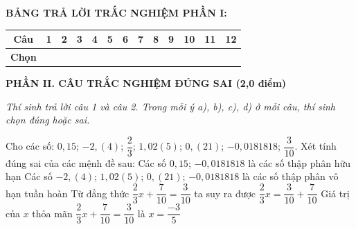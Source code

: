 \documentclass[12pt,a4paper]{article}
\begin{document}
\vspace{1mm}
\noindent\textbf{BẢNG TRẢ LỜI TRẮC NGHIỆM PHẦN I:}
\begin{center}
\begin{tabular}{|c|c|c|c|c|c|c|c|c|c|c|c|c|}
\hline
\textbf{Câu} & \textbf{1} & \textbf{2} & \textbf{3} & \textbf{4} & \textbf{5} & \textbf{6} & \textbf{7} & \textbf{8} & \textbf{9} & \textbf{10} & \textbf{11} & \textbf{12} \\
\hline
\textbf{Chọn} & \rule{0pt}{0.65cm} & & & & & & & & & & & \\
\hline
\end{tabular}
\end{center}
\vspace{2mm}

\setcounter{ex}{0}
\noindent\textbf{\large PHẦN II. CÂU TRẮC NGHIỆM ĐÚNG SAI (2,0 điểm)}

\textit{Thí sinh trả lời câu 1 và câu 2. Trong mỗi ý a), b), c), d) ở mỗi câu, thí sinh chọn đúng hoặc sai.}

\vspace{1mm}
\begin{ex}
Cho các số: $0,15$; $-2,(4)$; $\dfrac{2}{3}$; $1,02(5)$; $0,(21)$; $-0,0181818$; $\dfrac{3}{10}$. Xét tính đúng sai của các mệnh đề sau:
\choiceTF
{\True Các số $0,15$; $-0,0181818$ là các số thập phân hữu hạn}
{Các số $-2,(4)$; $1,02(5)$; $0,(21)$; $-0,0181818$ là các số thập phân vô hạn tuần hoàn}
{Từ đẳng thức $\dfrac{2}{3}x+\dfrac{7}{10}=\dfrac{3}{10}$ ta suy ra được $\dfrac{2}{3}x=\dfrac{3}{10}+\dfrac{7}{10}$}
{\True Giá trị của $x$ thỏa mãn $\dfrac{2}{3}x+\dfrac{7}{10}=\dfrac{3}{10}$ là $x=\dfrac{-3}{5}$}
\end{ex}
\end{document}
